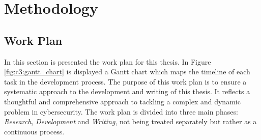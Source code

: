 \chapter{Methodology}
\label{chapter:methodology}


\section{Work Plan}

In this section is presented the work plan for this thesis. In Figure \ref{fig:c3:gantt_chart} is displayed a Gantt chart which maps the timeline of each task in the development process. The purpose of this work plan is to ensure a systematic approach to the development and writing of this thesis. It reflects a thoughtful and comprehensive approach to tackling a complex and dynamic problem in cybersecurity. The work plan is divided into three main phases: \textit{Research}, \textit{Development} and \textit{Writing}, not being treated separately but rather as a continuous process.

